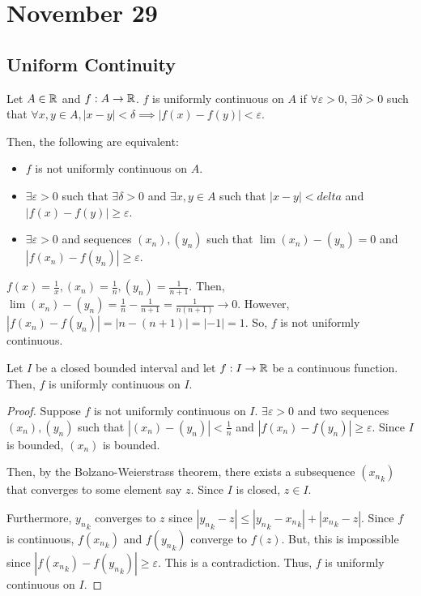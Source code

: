 \section{November 29}

\subsection{Uniform Continuity}
\begin{definition}
    Let $A \in \mathbb{R}$ and $f: A \to \mathbb{R}$. $f$ is uniformly continuous on $A$ if $\forall \varepsilon > 0$, $\exists \delta > 0$ such that $\forall x, y \in A, |x - y| < \delta \implies |f(x) - f(y)| < \varepsilon$.
\end{definition}

\noindent Then, the following are equivalent:
\begin{itemize}
    \item $f$ is not uniformly continuous on $A$.
    \item $\exists \varepsilon > 0$ such that $\exists \delta > 0$ and $\exists x, y \in A$ such that $|x - y| < delta$ and $|f(x) - f(y)| \geq \varepsilon$.
    \item $\exists \varepsilon > 0$ and sequences $(x_n), (y_n)$ such that $\lim (x_n) - (y_n) = 0$ and $|f(x_n) - f(y_n)| \geq \varepsilon$.
\end{itemize}
\begin{example}
    $f(x) = \frac{1}{x}, (x_n) = \frac{1}{n}, (y_n) = \frac{1}{n + 1}$. Then, $\lim (x_n) - (y_n) = \frac{1}{n} - \frac{1}{n + 1} = \frac{1}{n(n + 1)} \to 0$. However, $|f(x_n) - f(y_n)| = |n - (n + 1)| = |-1| = 1$. So, $f$ is not uniformly continuous.
\end{example}

\begin{theorem}
    Let $I$ be a closed bounded interval and let $f: I \to \mathbb{R}$ be a continuous function. Then, $f$ is uniformly continuous on $I$.
\end{theorem}
\begin{proof}
    Suppose $f$ is not uniformly continuous on $I$. $\exists \varepsilon > 0$ and two sequences $(x_n), (y_n)$ such that $|(x_n) - (y_n)| < \frac{1}{n}$ and $|f(x_n) - f(y_n)| \geq \varepsilon$. Since $I$ is bounded, $(x_n)$ is bounded. 
    
    Then, by the Bolzano-Weierstrass theorem, there exists a subsequence $({x_n}_k)$ that converges to some element say $z$. Since $I$ is closed, $z \in I$. 
    
    Furthermore, ${y_n}_k$ converges to $z$ since $|{y_n}_k - z| \leq |{y_n}_k - {x_n}_k| + |{x_n}_k - z|$. Since $f$ is continuous, $f({x_n}_k)$ and $f({y_n}_k)$ converge to $f(z)$. But, this is impossible since $|f({x_n}_k) - f({y_n}_k)| \geq \varepsilon$. This is a contradiction. Thus, $f$ is uniformly continuous on $I$.
\end{proof}